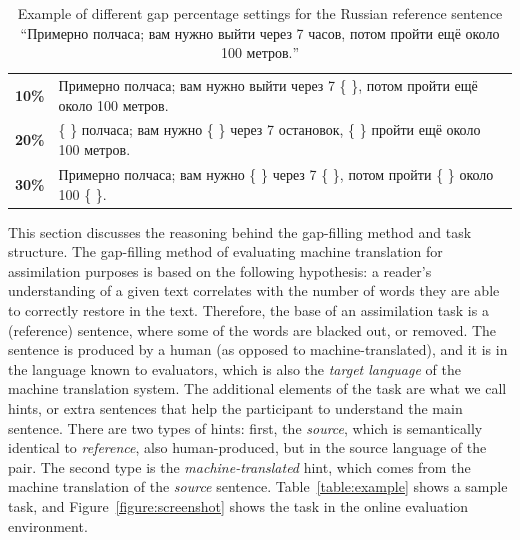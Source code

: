 \documentclass[11pt]{article}
\newcommand{\comment}[1]{\marginpar{\scriptsize\sf \textcolor{blue}{#1}}}
\newcommand{\rus}[1]{\foreignlanguage{russian}{#1}}
\begin{document}
\begin{table}
  \begin{tabular}{|l|l|}
     \hline
     \textbf{10\%}   & \rus{Примерно полчаса; вам нужно выйти через 7 \{ \}, потом пройти ещё около 100 метров.} \\
     \textbf{20\%}   & \rus{\{ \} полчаса; вам нужно \{ \} через 7 остановок, \{ \} пройти ещё около 100 метров.} \\
     \textbf{30\%} & \rus{Примерно полчаса; вам нужно \{ \} через 7 \{ \}, потом пройти \{ \} около 100 \{ \}.} \\
     \hline
  \end{tabular}
  \caption{Example of different gap percentage settings for the Russian reference sentence ``\rus{Примерно полчаса; вам нужно выйти через 7 часов, потом пройти ещё около 100 метров.}''} 
  \label{table:percentage}
\end{table}


This section discusses the reasoning behind the gap-filling method and task structure. The gap-filling method 
of evaluating machine translation for assimilation purposes is based on the following hypothesis: a reader's understanding 
of a given text correlates with the number of words they are able to correctly restore in the text. Therefore, the 
base of an assimilation task is a (reference) sentence, where some of the words are blacked out, or removed. The sentence \comment{EA: I'm sorry, I'm not sure what else I could explain here...}
is produced by a human (as opposed to machine-translated), and it is in the language known to evaluators, which is also 
the \emph{target language} of the machine translation system.
The additional elements of the task are what we call hints, or extra sentences that help the participant to understand 
the main sentence. There are two types of hints: first, the \emph{source}, which is semantically identical to \emph{reference}, 
also human-produced, but in the source language of the pair. The second type is the \emph{machine-translated} hint, which 
comes from the machine translation of the \emph{source} sentence. Table~\ref{table:example} shows a sample task, and Figure~\ref{figure:screenshot} shows the task in the online evaluation environment.
\end{document}
